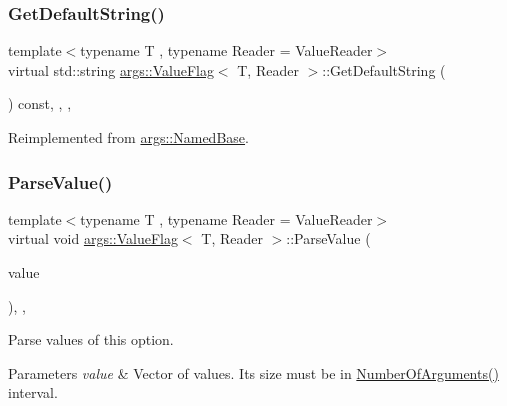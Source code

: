 \subsubsection{\texorpdfstring{Get\+Default\+String()}{GetDefaultString()}}
{\footnotesize\ttfamily template$<$typename T , typename Reader  = Value\+Reader$>$ \\
virtual std\+::string \hyperlink{classargs_1_1_value_flag}{args\+::\+Value\+Flag}$<$ T, Reader $>$\+::Get\+Default\+String (\begin{DoxyParamCaption}\item[{const \hyperlink{structargs_1_1_help_params}{Help\+Params} \&}]{ }\end{DoxyParamCaption}) const\hspace{0.3cm}{\ttfamily [inline]}, {\ttfamily [override]}, {\ttfamily [protected]}, {\ttfamily [virtual]}}



Reimplemented from \hyperlink{classargs_1_1_named_base_a5866b205907d924423eb8aac9a9e65f8}{args\+::\+Named\+Base}.

\mbox{\label{classargs_1_1_value_flag_af3a872ae8fb0fa34814cbc7e133aa9bf}} 
\subsubsection{\texorpdfstring{Parse\+Value()}{ParseValue()}}
{\footnotesize\ttfamily template$<$typename T , typename Reader  = Value\+Reader$>$ \\
virtual void \hyperlink{classargs_1_1_value_flag}{args\+::\+Value\+Flag}$<$ T, Reader $>$\+::Parse\+Value (\begin{DoxyParamCaption}\item[{const std\+::vector$<$ std\+::string $>$ \&}]{value }\end{DoxyParamCaption})\hspace{0.3cm}{\ttfamily [inline]}, {\ttfamily [override]}, {\ttfamily [virtual]}}

Parse values of this option.


\begin{DoxyParams}{Parameters}
{\em value} & Vector of values. It\textquotesingle{}s size must be in \hyperlink{classargs_1_1_value_flag_base_a96a10bfb949ad175dcf2ffba6a6ec3b6}{Number\+Of\+Arguments()} interval. \\
\hline
\end{DoxyParams}


